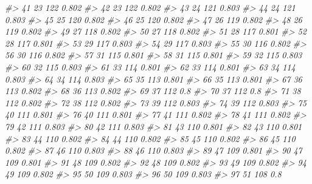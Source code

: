 \documentclass[]{book}
\newenvironment{Shaded}{\begin{snugshade}}{\end{snugshade}}
\newcommand{\CommentTok}[1]{\textcolor[rgb]{0.56,0.35,0.01}{\textit{#1}}}
\begin{document}
\begin{Shaded}
\begin{Highlighting}[]
\CommentTok{#> 41          23      122 0.802}
\CommentTok{#> 42          23      122 0.802}
\CommentTok{#> 43          24      121 0.803}
\CommentTok{#> 44          24      121 0.803}
\CommentTok{#> 45          25      120 0.802}
\CommentTok{#> 46          25      120 0.802}
\CommentTok{#> 47          26      119 0.802}
\CommentTok{#> 48          26      119 0.802}
\CommentTok{#> 49          27      118 0.802}
\CommentTok{#> 50          27      118 0.802}
\CommentTok{#> 51          28      117 0.801}
\CommentTok{#> 52          28      117 0.801}
\CommentTok{#> 53          29      117 0.803}
\CommentTok{#> 54          29      117 0.803}
\CommentTok{#> 55          30      116 0.802}
\CommentTok{#> 56          30      116 0.802}
\CommentTok{#> 57          31      115 0.801}
\CommentTok{#> 58          31      115 0.801}
\CommentTok{#> 59          32      115 0.803}
\CommentTok{#> 60          32      115 0.803}
\CommentTok{#> 61          33      114 0.801}
\CommentTok{#> 62          33      114 0.801}
\CommentTok{#> 63          34      114 0.803}
\CommentTok{#> 64          34      114 0.803}
\CommentTok{#> 65          35      113 0.801}
\CommentTok{#> 66          35      113 0.801}
\CommentTok{#> 67          36      113 0.802}
\CommentTok{#> 68          36      113 0.802}
\CommentTok{#> 69          37      112   0.8}
\CommentTok{#> 70          37      112   0.8}
\CommentTok{#> 71          38      112 0.802}
\CommentTok{#> 72          38      112 0.802}
\CommentTok{#> 73          39      112 0.803}
\CommentTok{#> 74          39      112 0.803}
\CommentTok{#> 75          40      111 0.801}
\CommentTok{#> 76          40      111 0.801}
\CommentTok{#> 77          41      111 0.802}
\CommentTok{#> 78          41      111 0.802}
\CommentTok{#> 79          42      111 0.803}
\CommentTok{#> 80          42      111 0.803}
\CommentTok{#> 81          43      110 0.801}
\CommentTok{#> 82          43      110 0.801}
\CommentTok{#> 83          44      110 0.802}
\CommentTok{#> 84          44      110 0.802}
\CommentTok{#> 85          45      110 0.802}
\CommentTok{#> 86          45      110 0.802}
\CommentTok{#> 87          46      110 0.803}
\CommentTok{#> 88          46      110 0.803}
\CommentTok{#> 89          47      109 0.801}
\CommentTok{#> 90          47      109 0.801}
\CommentTok{#> 91          48      109 0.802}
\CommentTok{#> 92          48      109 0.802}
\CommentTok{#> 93          49      109 0.802}
\CommentTok{#> 94          49      109 0.802}
\CommentTok{#> 95          50      109 0.803}
\CommentTok{#> 96          50      109 0.803}
\CommentTok{#> 97          51      108   0.8}

\end{Highlighting}
\end{Shaded}
\end{document}
